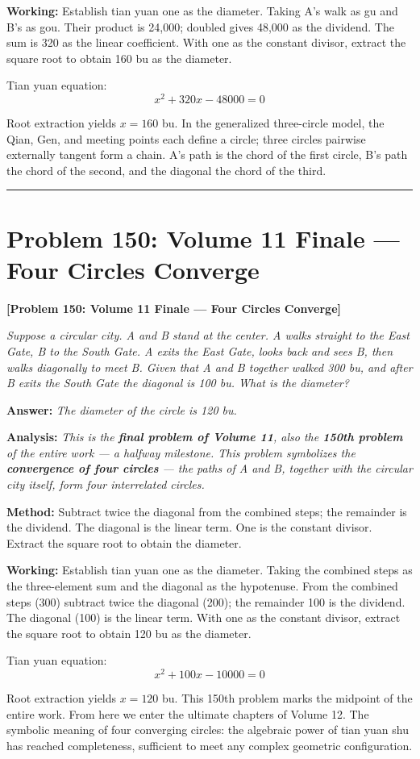 \documentclass[11pt,a4paper]{book}
\newcommand{\answer}[1]{\noindent\textbf{\color{anacolor}Answer: }\textit{#1}\par}
\newcommand{\method}[1]{\noindent\textbf{\color{methodcolor}Method: }#1\par}
\newcommand{\working}[1]{\noindent\textbf{\color{workcolor}Working: }#1\par}
\newcommand{\analysis}[1]{\noindent\textbf{\color{anacolor}Analysis: }\textit{#1}\par}
\newcommand{\shortline}{\noindent\rule{0.5\textwidth}{0.4pt}\par}
\begin{document}
\working{Establish tian yuan one as the diameter. Taking A's walk as gu and B's as gou. Their product is 24,000; doubled gives 48,000 as the dividend. The sum is 320 as the linear coefficient. With one as the constant divisor, extract the square root to obtain 160 bu as the diameter.

Tian yuan equation:
$$x^2 + 320x - 48000 = 0$$

Root extraction yields $x = 160$ bu. In the generalized three-circle model, the Qian, Gen, and meeting points each define a circle; three circles pairwise externally tangent form a chain. A's path is the chord of the first circle, B's path the chord of the second, and the diagonal the chord of the third.}

\shortline

\section{Problem 150: Volume 11 Finale --- Four Circles Converge}
\label{sec:prob150}

\noindent\textbf{\color{probcolor}[Problem 150: Volume 11 Finale --- Four Circles Converge]}

\textit{Suppose a circular city. A and B stand at the center. A walks straight to the East Gate, B to the South Gate. A exits the East Gate, looks back and sees B, then walks diagonally to meet B. Given that A and B together walked 300 bu, and after B exits the South Gate the diagonal is 100 bu. What is the diameter?}

\answer{The diameter of the circle is 120 bu.}

\analysis{This is the \textbf{final problem of Volume 11}, also the \textbf{150th problem} of the entire work --- a halfway milestone. This problem symbolizes the \textbf{convergence of four circles} --- the paths of A and B, together with the circular city itself, form four interrelated circles.}

\method{Subtract twice the diagonal from the combined steps; the remainder is the dividend. The diagonal is the linear term. One is the constant divisor. Extract the square root to obtain the diameter.}

\working{Establish tian yuan one as the diameter. Taking the combined steps as the three-element sum and the diagonal as the hypotenuse. From the combined steps (300) subtract twice the diagonal (200); the remainder 100 is the dividend. The diagonal (100) is the linear term. With one as the constant divisor, extract the square root to obtain 120 bu as the diameter.

Tian yuan equation:
$$x^2 + 100x - 10000 = 0$$

Root extraction yields $x = 120$ bu. This 150th problem marks the midpoint of the entire work. From here we enter the ultimate chapters of Volume 12. The symbolic meaning of four converging circles: the algebraic power of tian yuan shu has reached completeness, sufficient to meet any complex geometric configuration.}
\end{document}
